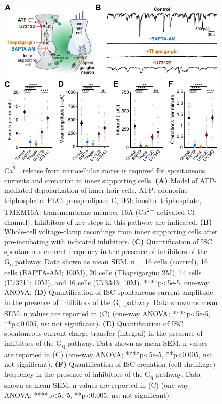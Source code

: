 \documentclass[9pt,lineno]{elife}
\begin{document}
\begin{figure}
\includegraphics[width=\linewidth]{figures/Fig1.pdf}
\caption{Ca\textsuperscript{2+} release from intracellular stores is required for spontaneous currents and crenation in inner supporting cells. 
\textbf{(A)} Model of ATP-mediated depolarization of inner hair cells. ATP: adenosine triphosphate, PLC: phospholipase C, IP3: inositol triphosphate, TMEM16A: transmembrane member 16A (Ca\textsuperscript{2+}-activated Cl\textsuperscript{--} channel). Inhibitors of key steps in this pathway are indicated. 
\textbf{(B)}	Whole-cell voltage-clamp recordings from inner supporting cells after pre-incubating with indicated inhibitors.
\textbf{(C)} Quantification of ISC spontaneous current frequency in the presence of inhibitors of the G\textsubscript{q} pathway. Data shown as mean \textpm \hspace{0.2 mm} SEM. n = 16 cells (control), 16 cells (BAPTA-AM; 100\textmu M), 20 cells (Thapsigargin; 2\textmu M), 14 cells (U73211; 10\textmu M), and 16 cells (U73343; 10\textmu M). ****p<5e-5, one-way ANOVA.
\textbf{(D)} Quantification of ISC spontaneous current amplitude in the presence of inhibitors of the G\textsubscript{q} pathway. Data shown as mean \textpm \hspace{0.2 mm} SEM. n values are reported in (C) (one-way ANOVA; ****p<5e-5, **p<0.005, ns: not significant).
\textbf{(E)} Quantification of ISC spontaneous current charge transfer (integral) in the presence of inhibitors of the G\textsubscript{q} pathway. Data shown as mean \textpm \hspace{0.2 mm} SEM. n values are reported in (C) (one-way ANOVA; ****p<5e-5, **p<0.005, ns: not significant).
\textbf{(F)} Quantification of ISC crenation (cell shrinkage) frequency in the presence of inhibitors of the G\textsubscript{q} pathway. Data shown as mean \textpm SEM. n values are reported in (C) (one-way ANOVA; ****p<5e-5, **p<0.005, ns: not significant).
}
\label{fig:f1}
\end{figure}
\end{document}
